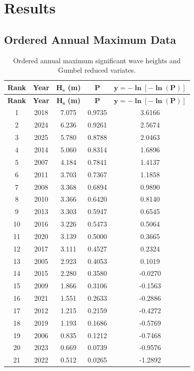 \documentclass[12pt,a4paper]{article}
\begin{document}
\section{Results}

\subsection{Ordered Annual Maximum Data}

\begin{center}
\small
\begin{longtable}{ccccc}
\caption{Ordered annual maximum significant wave heights and Gumbel reduced variates.}\\
\toprule
\textbf{Rank} & \textbf{Year} & \(\mathbf{H_s}\) \textbf{(m)} & \(\mathbf{P}\) & \(\mathbf{y=-\ln[-\ln(P)]}\) \\
\midrule
\endfirsthead

\toprule
\textbf{Rank} & \textbf{Year} & \(\mathbf{H_s}\) \textbf{(m)} & \(\mathbf{P}\) & \(\mathbf{y=-\ln[-\ln(P)]}\) \\
\midrule
\endhead

1 & 2018 & 7.075 & 0.9735 & 3.6166 \\
2 & 2024 & 6.236 & 0.9261 & 2.5674 \\
3 & 2025 & 5.780 & 0.8788 & 2.0463 \\
4 & 2014 & 5.060 & 0.8314 & 1.6896 \\
5 & 2007 & 4.184 & 0.7841 & 1.4137 \\
6 & 2011 & 3.703 & 0.7367 & 1.1858 \\
7 & 2008 & 3.368 & 0.6894 & 0.9890 \\
8 & 2010 & 3.366 & 0.6420 & 0.8140 \\
9 & 2013 & 3.303 & 0.5947 & 0.6545 \\
10 & 2016 & 3.226 & 0.5473 & 0.5064 \\
11 & 2020 & 3.139 & 0.5000 & 0.3665 \\
12 & 2017 & 3.111 & 0.4527 & 0.2324 \\
13 & 2005 & 2.923 & 0.4053 & 0.1019 \\
14 & 2015 & 2.280 & 0.3580 & -0.0270 \\
15 & 2009 & 1.866 & 0.3106 & -0.1563 \\
16 & 2021 & 1.551 & 0.2633 & -0.2886 \\
17 & 2012 & 1.215 & 0.2159 & -0.4272 \\
18 & 2019 & 1.193 & 0.1686 & -0.5769 \\
19 & 2006 & 0.835 & 0.1212 & -0.7468 \\
20 & 2023 & 0.669 & 0.0739 & -0.9576 \\
21 & 2022 & 0.512 & 0.0265 & -1.2892 \\

\bottomrule
\end{longtable}
\end{center}
\end{document}
